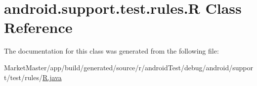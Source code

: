 \hypertarget{classandroid_1_1support_1_1test_1_1rules_1_1R}{}\section{android.\+support.\+test.\+rules.\+R Class Reference}
\label{classandroid_1_1support_1_1test_1_1rules_1_1R}


The documentation for this class was generated from the following file\+:\begin{DoxyCompactItemize}
\item 
Market\+Master/app/build/generated/source/r/android\+Test/debug/android/support/test/rules/\mbox{\hyperlink{androidTest_2debug_2android_2support_2test_2rules_2R_8java}{R.\+java}}\end{DoxyCompactItemize}
